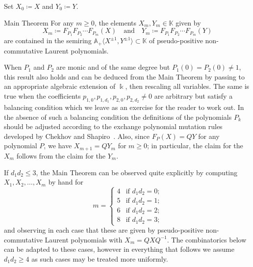 \documentclass[ALCO,ThmDefs,Unicode,epreuves]{cedram}
\newcommand{\kk}{\Bbbk}
\renewcommand{\AA}{\mathbb{A}}
\newcommand{\KK}{\mathbb{K}}
\newenvironment{introremark}{\begin{rema*}}{\end{rema*}}
\newenvironment{maintheorem}{\begin{enonce*}{Main Theorem}}{\end{enonce*}}
\begin{document}
 Set $X_0\coloneqq X$ and $Y_0\coloneqq Y$.
 \begin{maintheorem}
 \label{th:main}
 For any $m\ge0$, the elements $ X_m, Y_m\in\KK$ given by
 \begin{equation}
 \label{eq:non-commutative initial cluster mutation}
 X_m\coloneqq F_{P_1}F_{P_2}\cdots F_{P_m}(X)\quad\text{and}\quad Y_m\coloneqq F_{P_1}F_{P_2}\cdots F_{P_m}(Y)
 \end{equation}
 are contained in the semiring $\AA_+\langle X^{\pm1},Y^{\pm1}\rangle\subset\KK$ of pseudo-positive non-commutative Laurent polynomials.
 \end{maintheorem}
 \begin{introremark}
 When $P_1$ and $P_2$ are monic and of the same degree but $P_1(0)=P_2(0)\ne1$, this result also holds and can be deduced from the Main Theorem by passing to an appropriate algebraic extension of $\kk$, then rescaling all variables. 
 The same is true when the coefficients $p_{1,0},p_{1,d_1},p_{2,0},p_{2,d_2}\ne0$ are arbitrary but satisfy a balancing condition which we leave as an exercise for the reader to work out. 
 In the absence of such a balancing condition the definitions of the polynomials $P_k$ should be adjusted according to the exchange polynomial mutation rules developed by Chekhov and Shapiro~\cite{chekhov-shapiro}.
 Also, since $F_P(X)=QY$ for any polynomial $P$, we have $X_{m+1}=QY_m$ for $m\ge0$; in particular, the claim for the $X_m$ follows from the claim for the $Y_m$.
 \end{introremark}
 \begin{introremark}
 If $d_1d_2\le3$, the Main Theorem can be observed quite explicitly by computing $X_1,X_2,\ldots,X_m$ by hand for 
 \[
 m=\begin{cases} 4 & \text{if $d_1d_2=0$;}\\ 5 & \text{if $d_1d_2=1$;}\\ 6 & \text{if $d_1d_2=2$;}\\ 8 & \text{if $d_1d_2=3$;}\end{cases}
 \]
 and observing in each case that these are given by pseudo-positive non-commutative Laurent polynomials with $X_m=QXQ^{-1}$.
 The combinatorics below can be adapted to these cases, however in everything that follows we assume $d_1d_2\ge4$ as such cases may be treated more uniformly.
 \end{introremark}
\end{document}
